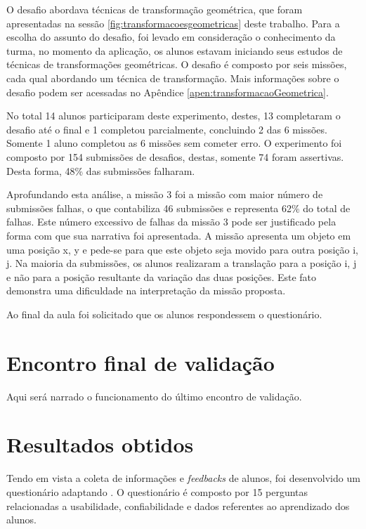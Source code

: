 \documentclass[
	12pt,				%
	oneside,			%
	a4paper,			%
	english,			%
	french,				%
	spanish,			%
	brazil,				%
	]{abntex2}
\begin{document}
O desafio abordava técnicas de transformação geométrica, que foram apresentadas na sessão \ref{fig:transformacoesgeometricas} deste trabalho. Para a escolha do assunto do desafio, foi levado em consideração o conhecimento da turma, no momento da aplicação, os alunos estavam iniciando seus estudos de técnicas de transformações geométricas. O desafio é composto por seis missões, cada qual abordando um técnica de transformação. Mais informações sobre o desafio podem ser acessadas no Apêndice \ref{apen:transformacaoGeometrica}.

No total 14 alunos participaram deste experimento, destes, 13 completaram o desafio até o final e 1 completou parcialmente, concluindo 2 das 6 missões. Somente 1 aluno completou as 6 missões sem cometer erro. O experimento foi composto por 154 submissões de desafios, destas, somente 74 foram assertivas. Desta forma, 48\% das submissões falharam.

Aprofundando esta análise, a missão 3 foi a missão com maior número de submissões falhas, o que contabiliza 46 submissões e representa 62\% do total de falhas. Este número excessivo de falhas da missão 3 pode ser justificado pela forma com que sua narrativa foi apresentada. A missão apresenta um objeto em uma posição x, y e pede-se para que este objeto seja movido para outra posição i, j. Na maioria da submissões, os alunos realizaram a translação para a posição i, j e não para a posição resultante da variação das duas posições. Este fato demonstra uma dificuldade na interpretação da missão proposta.

Ao final da aula foi solicitado que os alunos respondessem o questionário.

\section{Encontro final de validação}

Aqui será narrado o funcionamento do último encontro de validação.

\section{Resultados obtidos}

Tendo em vista a coleta de informações e \textit{feedbacks} de alunos, foi desenvolvido um questionário adaptando \cite{bez2013}. O questionário é composto por 15 perguntas relacionadas a usabilidade, confiabilidade e dados referentes ao aprendizado dos alunos. 
\end{document}
